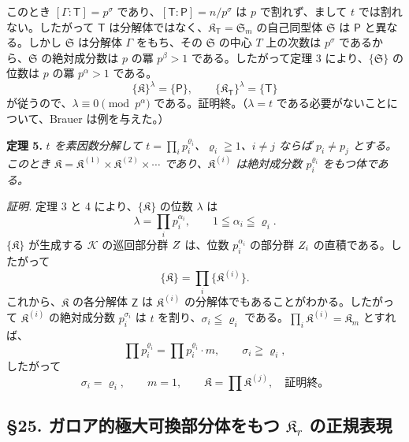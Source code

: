 このとき \([\Gamma:\mathsf{T}]=p^\sigma\) であり、\([\mathsf{T}:\mathsf P]=n/p^\sigma\) は \(p\) で割れず、まして \(t\) では割れない。したがって \(\mathsf{T}\) は分解体ではなく、\(\mathfrak K_{\mathsf{T}}=\mathfrak S_m\) の自己同型体 \(\mathfrak S\) は \(\mathsf P\) と異なる。しかし \(\mathfrak S\) は分解体 \(\Gamma\) をもち、その \(\mathfrak S\) の中心 \(T\) 上の次数は \(p^\sigma\) であるから、\(\mathfrak S\) の絶対成分数は \(p\) の冪 \(p^\beta>1\) である。したがって定理 3 により、\(\{\mathfrak S\}\) の位数は \(p\) の冪 \(p^\alpha>1\) である。
\[
\{\mathfrak K\}^{\lambda}=\{\mathsf P\},
\qquad
\{\mathfrak K_{\mathsf{T}}\}^{\lambda}=\{\mathsf{T}\}
\]
が従うので、\(\lambda\equiv0\pmod {p^\alpha}\) である。証明終。（\(\lambda=t\) である必要がないことについて、Brauer は例を与えた。）

\textbf{定理 5.} \emph{\(t\) を素因数分解して \(t=\prod_i p_i^{\varrho_i}\)、\(\varrho_i\geqq1\)、\(i\ne j\) ならば \(p_i\ne p_j\) とする。このとき \(\mathfrak K=\mathfrak K^{(1)}\times\mathfrak K^{(2)}\times\cdots\) であり、\(\mathfrak K^{(i)}\) は絶対成分数 \(p_i^{\varrho_i}\) をもつ体である。}

\emph{証明.} 定理 3 と 4 により、\(\{\mathfrak K\}\) の位数 \(\lambda\) は
\[
\lambda=\prod_i p_i^{\alpha_i},\qquad 1\leqq\alpha_i\leqq\varrho_i.
\]
\(\{\mathfrak K\}\) が生成する \(\mathscr K\) の巡回部分群 \(\mathscr \mathsf{Z}\) は、位数 \(p_i^{\alpha_i}\) の部分群 \(\mathscr \mathsf{Z}_i\) の直積である。したがって
\[
\{\mathfrak K\}=\prod_i\{\mathfrak K^{(i)}\}.
\]
これから、\(\mathfrak K\) の各分解体 \(\mathsf{Z}\) は \(\mathfrak K^{(i)}\) の分解体でもあることがわかる。したがって \(\mathfrak K^{(i)}\) の絶対成分数 \(p_i^{\sigma_i}\) は \(t\) を割り、\(\sigma_i\leqq\varrho_i\) である。\(\prod_i\mathfrak K^{(i)}=\mathfrak K_m\) とすれば、
\[
\prod p_i^{\varrho_i}=\prod p_i^{\varrho_i}\cdot m,
\qquad
\sigma_i\geqq\varrho_i,
\]
したがって
\[
\sigma_i=\varrho_i,\qquad m=1,\qquad
\mathfrak K=\prod \mathfrak K^{(j)},
\quad\text{証明終。}
\]

\subsection*{\S 25. ガロア的極大可換部分体をもつ \(\mathfrak K_r\) の正規表現\protect\footnotemark}
\label{normaldarstellung-von-r_r-mit-galoisschem-maximalem-kommutativem-teilkoerper-1}

